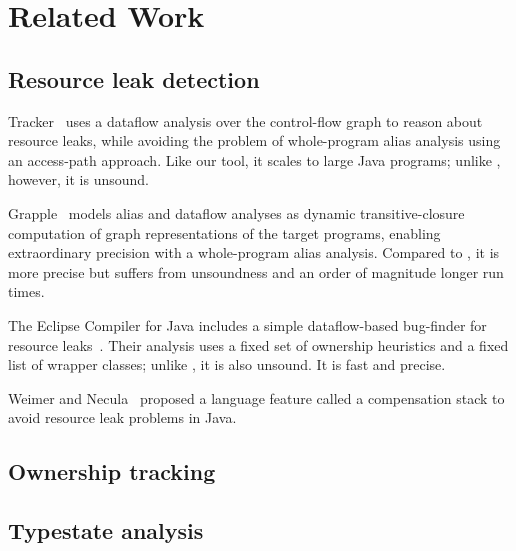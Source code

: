 \section{Related Work}
\label{sec:relatedwork}

\subsection{Resource leak detection}
\label{sec:rw-resource-leaks}



Tracker~\cite{TorlakC10} uses a dataflow analysis over the control-flow
graph to reason about resource leaks, while avoiding the problem of
whole-program alias analysis using an access-path approach. Like our tool,
it scales to large Java programs; unlike \tool, however, it is unsound.

Grapple~\cite{zuo2019grapple} models alias and dataflow analyses as
dynamic transitive-closure computation of graph representations of
the target programs, enabling extraordinary precision with a whole-program
alias analysis. Compared to \tool, it is more precise but suffers
from unsoundness and an order of magnitude longer run times.

The Eclipse Compiler for Java includes a simple dataflow-based bug-finder
for resource leaks~\cite{ecj-resource-leak}. Their analysis uses a fixed
set of ownership heuristics and a fixed list of wrapper classes; unlike
\tool, it is also unsound. It is fast and  precise.

Weimer and Necula~\cite{WeimerN04} proposed a language feature called
a compensation stack to avoid resource leak problems in Java.

\subsection{Ownership tracking}



\subsection{Typestate analysis}
\label{sec:rw-typestate}

